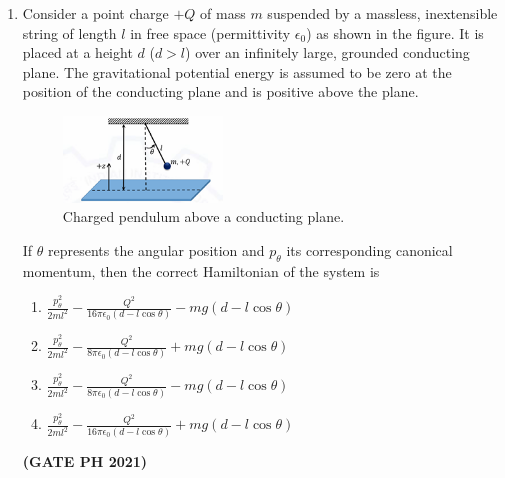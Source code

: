 \documentclass[14pt, a4paper]{extarticle}
\begin{document}
\begin{enumerate}[label=\textbf{Q.\arabic*}]
\begin{enumerate}[label=\textbf{Q.\arabic*}]
\item Consider a point charge $+Q$ of mass $m$ suspended by a massless, inextensible string of length $l$ in free space (permittivity $\epsilon_0$) as shown in the figure. It is placed at a height $d$ ($d > l$) over an infinitely large, grounded conducting plane. The gravitational potential energy is assumed to be zero at the position of the conducting plane and is positive above the plane.
\begin{figure}[H]
\centering
\includegraphics[width=0.4\textwidth]{figs/q40fig21.png}
\caption{Charged pendulum above a conducting plane.}
\label{fig:q30ph}
\end{figure}
If $\theta$ represents the angular position and $p_{\theta}$ its corresponding canonical momentum, then the correct Hamiltonian of the system is
\begin{enumerate}
\item $\frac{p_{\theta}^2}{2ml^2} - \frac{Q^2}{16\pi\epsilon_0(d-l\cos\theta)} - mg(d-l\cos\theta)$
\item $\frac{p_{\theta}^2}{2ml^2} - \frac{Q^2}{8\pi\epsilon_0(d-l\cos\theta)} + mg(d-l\cos\theta)$
\item $\frac{p_{\theta}^2}{2ml^2} - \frac{Q^2}{8\pi\epsilon_0(d-l\cos\theta)} - mg(d-l\cos\theta)$
\item $\frac{p_{\theta}^2}{2ml^2} - \frac{Q^2}{16\pi\epsilon_0(d-l\cos\theta)} + mg(d-l\cos\theta)$
\end{enumerate}
\hfill \textbf{(GATE PH 2021)}


\end{enumerate}
\end{enumerate}
\end{document}
